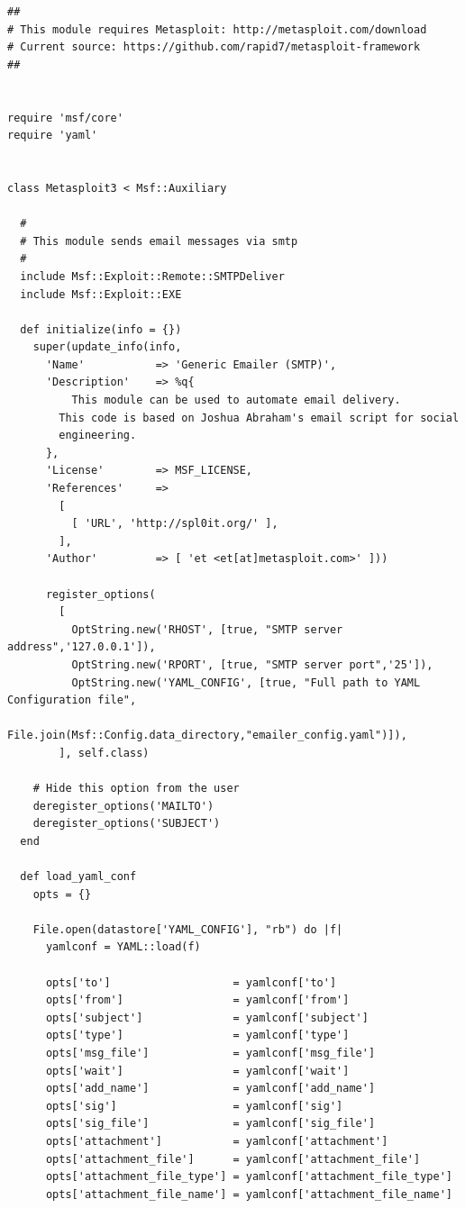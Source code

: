 \documentclass[10pt,a4paper]{article}
\begin{document}
\begin{verbatim}
##
# This module requires Metasploit: http://metasploit.com/download
# Current source: https://github.com/rapid7/metasploit-framework
##


require 'msf/core'
require 'yaml'


class Metasploit3 < Msf::Auxiliary

  #
  # This module sends email messages via smtp
  #
  include Msf::Exploit::Remote::SMTPDeliver
  include Msf::Exploit::EXE

  def initialize(info = {})
    super(update_info(info,
      'Name'           => 'Generic Emailer (SMTP)',
      'Description'    => %q{
          This module can be used to automate email delivery.
        This code is based on Joshua Abraham's email script for social
        engineering.
      },
      'License'        => MSF_LICENSE,
      'References'     =>
        [
          [ 'URL', 'http://spl0it.org/' ],
        ],
      'Author'         => [ 'et <et[at]metasploit.com>' ]))

      register_options(
        [
          OptString.new('RHOST', [true, "SMTP server address",'127.0.0.1']),
          OptString.new('RPORT', [true, "SMTP server port",'25']),
          OptString.new('YAML_CONFIG', [true, "Full path to YAML Configuration file",
            File.join(Msf::Config.data_directory,"emailer_config.yaml")]),
        ], self.class)

    # Hide this option from the user
    deregister_options('MAILTO')
    deregister_options('SUBJECT')
  end

  def load_yaml_conf
    opts = {}

    File.open(datastore['YAML_CONFIG'], "rb") do |f|
      yamlconf = YAML::load(f)

      opts['to']                   = yamlconf['to']
      opts['from']                 = yamlconf['from']
      opts['subject']              = yamlconf['subject']
      opts['type']                 = yamlconf['type']
      opts['msg_file']             = yamlconf['msg_file']
      opts['wait']                 = yamlconf['wait']
      opts['add_name']             = yamlconf['add_name']
      opts['sig']                  = yamlconf['sig']
      opts['sig_file']             = yamlconf['sig_file']
      opts['attachment']           = yamlconf['attachment']
      opts['attachment_file']      = yamlconf['attachment_file']
      opts['attachment_file_type'] = yamlconf['attachment_file_type']
      opts['attachment_file_name'] = yamlconf['attachment_file_name']


\end{verbatim}
\end{document}
